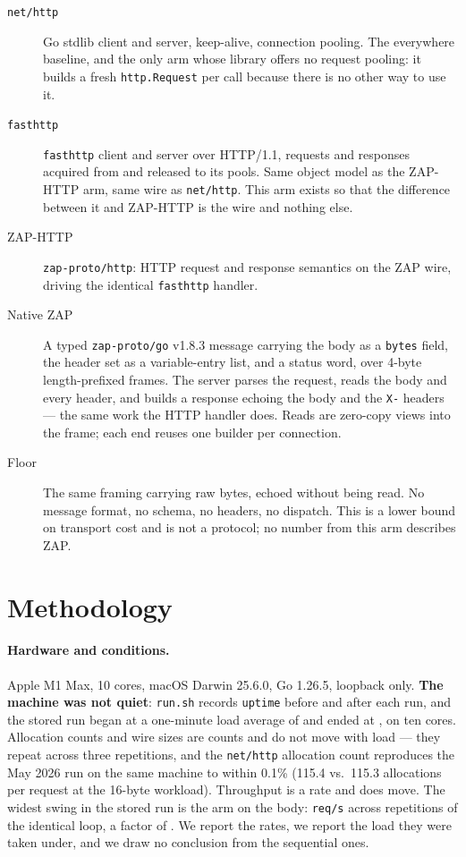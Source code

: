 \documentclass[11pt]{article}
\begin{document}
\begin{description}
  \item[\texttt{net/http}] Go stdlib client and server, keep-alive, connection
    pooling. The everywhere baseline, and the only arm whose library offers no
    request pooling: it builds a fresh \texttt{http.Request} per call because
    there is no other way to use it.
  \item[\texttt{fasthttp}] \texttt{fasthttp} client and server over HTTP/1.1,
    requests and responses acquired from and released to its pools. Same object
    model as the ZAP-HTTP arm, same wire as \texttt{net/http}. This arm exists so
    that the difference between it and ZAP-HTTP is the wire and nothing else.
  \item[ZAP-HTTP] \texttt{zap-proto/http}: HTTP request and response semantics on
    the ZAP wire, driving the identical \texttt{fasthttp} handler.
  \item[Native ZAP] A typed \texttt{zap-proto/go} v1.8.3 message carrying the body
    as a \texttt{bytes} field, the header set as a variable-entry list, and a
    status word, over 4-byte length-prefixed frames. The server parses the
    request, reads the body and every header, and builds a response echoing the
    body and the \texttt{X-} headers --- the same work the HTTP handler does.
    Reads are zero-copy views into the frame; each end reuses one builder per
    connection.
  \item[Floor] The same framing carrying raw bytes, echoed without being read.
    No message format, no schema, no headers, no dispatch. This is a lower bound
    on transport cost and is not a protocol; no number from this arm describes
    ZAP.
\end{description}

\section{Methodology}

\paragraph{Hardware and conditions.} Apple M1 Max, 10 cores, macOS Darwin 25.6.0,
Go 1.26.5, loopback only. \textbf{The machine was not quiet}: \texttt{run.sh}
records \texttt{uptime} before and after each run, and the stored run began at a
one-minute load average of \loadStart{} and ended at \loadEnd, on ten cores. Allocation
counts and wire sizes are counts and do not move with load --- they repeat across
three repetitions, and the \texttt{net/http} allocation count reproduces the May
2026 run on the same machine to within 0.1\% (115.4 vs.\ 115.3 allocations per
request at the 16-byte workload). Throughput is a rate and does move. The widest
swing in the stored run is the \spreadArm{} arm on the \spreadWorkload{} body:
\spreadValues{} \texttt{req/s} across \nReps{} repetitions of the identical loop,
a factor of \spreadFactor. We report the rates, we
report the load they were taken under, and we draw no conclusion from the
sequential ones.
\end{document}
